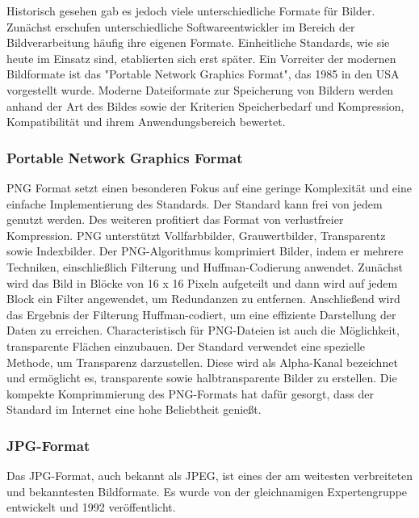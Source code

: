     Historisch gesehen gab es jedoch viele unterschiedliche Formate für Bilder. 
    Zunächst erschufen unterschiedliche Softwareentwickler im Bereich der Bildverarbeitung häufig ihre eigenen Formate.
    Einheitliche Standards, wie sie heute im Einsatz sind, etablierten sich erst später.
    Ein Vorreiter der modernen Bildformate ist das "Portable Network Graphics Format", das 1985 in den USA vorgestellt wurde. 
    Moderne Dateiformate zur Speicherung von Bildern werden anhand der Art des Bildes sowie der Kriterien Speicherbedarf und Kompression, Kompatibilität und ihrem Anwendungsbereich bewertet. 
    
    \subsubsection{Portable Network Graphics Format}
        \acf{PNG} Format setzt einen besonderen Fokus auf eine geringe Komplexität und eine einfache Implementierung des Standards. 
        Der Standard kann frei von jedem genutzt werden.
        Des weiteren profitiert das Format von verlustfreier Kompression. 
        \ac{PNG} unterstützt Vollfarbbilder, Grauwertbilder, Transparentz sowie Indexbilder. 
        Der \ac{PNG}-Algorithmus komprimiert Bilder, indem er mehrere Techniken, einschließlich Filterung und Huffman-Codierung anwendet. 
        Zunächst wird das Bild in Blöcke von 16 x 16 Pixeln aufgeteilt und dann wird auf jedem Block ein Filter angewendet, um Redundanzen zu entfernen. 
        Anschließend wird das Ergebnis der Filterung Huffman-codiert, um eine effiziente Darstellung der Daten zu erreichen.
        Characteristisch für PNG-Dateien ist auch die Möglichkeit, transparente Flächen einzubauen. 
        Der Standard verwendet eine spezielle Methode, um Transparenz darzustellen. 
        Diese wird als Alpha-Kanal bezeichnet und ermöglicht es, transparente sowie halbtransparente Bilder zu erstellen.
        Die kompekte Komprimmierung des PNG-Formats hat dafür gesorgt, dass der Standard im Internet eine hohe Beliebtheit genießt. 
    
    \subsubsection{JPG-Format}

    Das \ac{JPG}-Format, auch bekannt als \ac{JPEG}, ist eines der am weitesten verbreiteten und bekanntesten Bildformate. Es wurde von der gleichnamigen Expertengruppe entwickelt und 1992 veröffentlicht.
    
